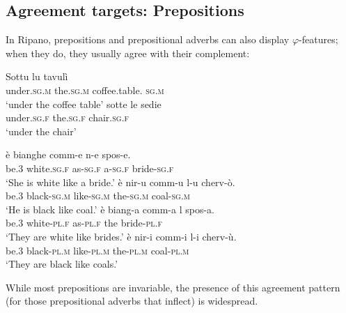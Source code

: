 \documentclass[output=paper
,modfonts
,nonflat]{langsci/langscibook}
\begin{document}
\subsection{Agreement targets: Prepositions} \label{sec-dalessandro:1.3}
In Ripano, prepositions and prepositional adverbs can also display $\varphi$-features; when they do, they usually agree with their complement:

\begin{exe}
	\ex \label{ex-dalessandro:6}\citet[309]{Ledgeway2012} \xlist
	\ex 
	\gll Sottu      lu     tavulì \\
	under.\textsc{sg}.\textsc{m}   the.\textsc{sg}.\textsc{m}  coffee.table. \textsc{sg}.\textsc{m}\\
	\glt `under the coffee table' 
	\ex
	\gll  sotte     le     sedie\\
	under.\textsc{sg}.\textsc{f}  the.\textsc{sg}.\textsc{f}  chair.\textsc{sg}.\textsc{f}\\
	\glt `under the chair' 
	\endxlist
\end{exe}
\begin{exe}
	\ex \label{ex-dalessandro:7}\citet[54]{Lambertelli2003} \xlist
	\ex 
	\gll   è   bianghe   comm-e   n-e   spos-e.\\
	be.\textsc{3}  white.\textsc{sg.f} as-\textsc{sg.f}    a-\textsc{sg.f}  bride-\textsc{sg.f}\\
	\glt `She is white like a bride.' 
	\ex
	\gll  è   nir-u     comm-u   l-u     cherv-ò.\\
	be.3  black-\textsc{sg.m} like-\textsc{sg.m} the-\textsc{sg.m} coal-\textsc{sg.m}\\
	\glt `He is black like coal.' 
	\ex
	\gll  è  biang-a    comm-a  l  spos-a.\\
	be.3  white-\textsc{pl.f} as-\textsc{pl.f}    the  bride-\textsc{pl.f}\\
	\glt `They are white like brides.' 
	\ex
	\gll  è   nir-i     comm-i  l-i     cherv-ù.\\
	be.3   black-\textsc{pl.m} like-\textsc{pl.m} the-\textsc{pl.m} coal-\textsc{pl.m}\\
	\glt `They are black like coals.'
	\endxlist
\end{exe}
While most prepositions are invariable, the presence of this agreement pattern (for those prepositional adverbs that inflect) is widespread.
\end{document}
